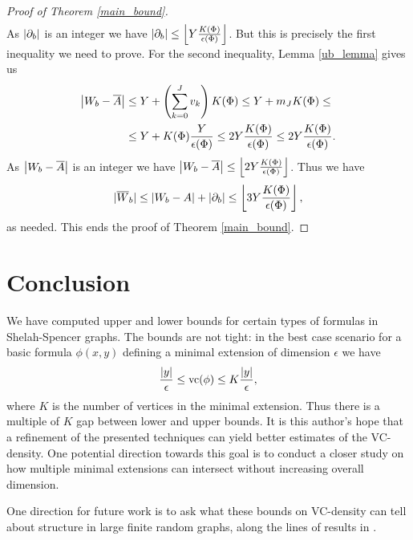 \begin{proof} [Proof of Theorem \ref{main_bound}]
\begin{align*}
  \end{align*}
  As $|\partial_b|$ is an integer we have $|\partial_b| \leq \left \lfloor Y \frac{K(\Phi)}{\epsilon(\Phi)} \right \rfloor$.
  But this is precisely the first inequality we need to prove.
  For the second inequality, Lemma \ref{ub_lemma} gives us
  \begin{align*}
    \left|W_b - \overline{A}\right| &\leq Y + \left(\sum_{k=0}^J v_{k}\right) K(\Phi) \leq Y + m_J K(\Phi) \leq \\
    &\leq Y + K(\Phi) \frac{Y}{\epsilon(\Phi)} \leq 2Y \frac{K(\Phi)}{\epsilon(\Phi)} \leq 2 Y \frac{K(\Phi)}{\epsilon(\Phi)}.
  \end{align*}
  As $\left|W_b - \overline{A}\right|$ is an integer we have $\left|W_b - \overline{A}\right| \leq \left \lfloor 2 Y \frac{K(\Phi)}{\epsilon(\Phi)} \right \rfloor$.
  Thus we have
  \begin{align*}
      |{\overline{W}}_b| \leq \left|W_b - A\right| + \left|\partial_b\right| \leq \left \lfloor 3 Y \frac{K(\Phi)}{\epsilon(\Phi)} \right \rfloor,
  \end{align*}
  as needed.
  This ends the proof of Theorem \ref{main_bound}.
\end{proof}


\section{Conclusion}
We have computed upper and lower bounds for certain types of formulas in Shelah-Spencer graphs.
The bounds are not tight: in the best case scenario for a basic formula $\phi(x,y)$ defining a minimal extension of
dimension $\epsilon$ we have
\begin{align*}
  \frac{|y|}{\epsilon} \leq \operatorname{vc}(\phi) \leq K \frac{|y|}{\epsilon},
\end{align*}
where $K$ is the number of vertices in the minimal extension.
Thus there is a multiple of $K$ gap between lower and upper bounds.
It is this author's hope that a refinement of the presented techniques can yield better estimates of the VC-density.
One potential direction towards this goal is to conduct a closer study on
how multiple minimal extensions can intersect without increasing overall dimension.

One direction for future work is to ask what these bounds on VC-density can tell about structure in large finite random graphs, along the lines of results in \cite{anthony}.

